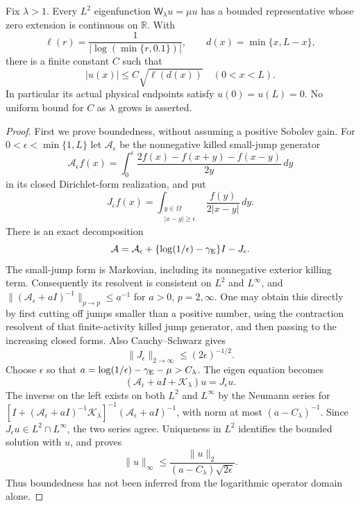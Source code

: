 \begin{theorem}
\label{thm:v118-eigen-endpoint-zero}
Fix $\lambda>1$.  Every $L^2$ eigenfunction
$\mathsf W_\lambda u=\mu u$ has a bounded representative whose zero
extension is continuous on $\mathbb R$.  With
\[
 \ell(r)=\frac1{|\log(\min\{r,0.1\})|},\qquad
 d(x)=\min\{x,L-x\},
\]
there is a finite constant $C$ such that
\begin{equation}\label{eq:v118-eigen-boundary-decay}
 |u(x)|\le C\sqrt{\ell(d(x))}\quad(0<x<L).
\end{equation}
In particular its actual physical endpoints satisfy $u(0)=u(L)=0$.
No uniform bound for $C$ as $\lambda$ grows is asserted.
\end{theorem}
\begin{proof}
First we prove boundedness, without assuming a positive Sobolev gain.
For $0<\epsilon<\min\{1,L\}$ let $\mathcal A_\epsilon$ be the
nonnegative killed small-jump generator
\[
 \mathcal A_\epsilon f(x)=\int_0^\epsilon
       \frac{2f(x)-f(x+y)-f(x-y)}{2y}\,dy
\]
in its closed Dirichlet-form realization, and put
\[
 J_\epsilon f(x)=\int_{\substack{y\in\Omega\\|x-y|\ge\epsilon}}
                    \frac{f(y)}{2|x-y|}\,dy.
\]
There is an exact decomposition
\[
 \mathcal A=\mathcal A_\epsilon+
       \{\log(1/\epsilon)-\gamma_{\rm E}\}I-J_\epsilon.
\]
The small-jump form is Markovian, including its nonnegative exterior
killing term.  Consequently its resolvent is consistent on $L^2$
and $L^\infty$, and
$\|(\mathcal A_\epsilon+aI)^{-1}\|_{p\to p}\le a^{-1}$ for
$a>0$, $p=2,\infty$.  One may obtain this directly by first cutting
off jumps smaller than a positive number, using the contraction
resolvent of that finite-activity killed jump generator, and then
passing to the increasing closed forms.  Also Cauchy--Schwarz gives
\[
 \|J_\epsilon\|_{2\to\infty}\le(2\epsilon)^{-1/2}.
\]
Choose $\epsilon$ so that
$a=\log(1/\epsilon)-\gamma_{\rm E}-\mu>C_\lambda$.
The eigen equation becomes
\[
 (\mathcal A_\epsilon+aI+\mathcal K_\lambda)u=J_\epsilon u.
\]
The inverse on the left exists on both $L^2$ and $L^\infty$ by the
Neumann series for
$[I+(\mathcal A_\epsilon+aI)^{-1}\mathcal K_\lambda]^{-1}
 (\mathcal A_\epsilon+aI)^{-1}$, with norm at most
$(a-C_\lambda)^{-1}$.  Since $J_\epsilon u\in L^2\cap L^\infty$,
the two series agree.  Uniqueness in $L^2$ identifies the bounded
solution with $u$, and proves
\[
 \|u\|_\infty\le
   \frac{\|u\|_2}{(a-C_\lambda)\sqrt{2\epsilon}}.
\]
Thus boundedness has not been inferred from the logarithmic operator
domain alone.


\end{proof}
